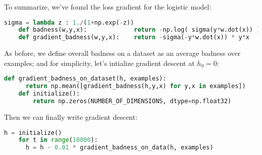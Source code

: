   \vspace{\baselineskip}

  To summarize, we've found the loss gradient for the logistic model:
  \begin{lstlisting}[language=Python, basicstyle=\footnotesize\ttfamily]
    sigma = lambda z : 1./(1+np.exp(-z))
    def badness(w,y,x):             return -np.log( sigma(y*w.dot(x)) )
    def gradient_badness(w,y,x):    return -sigma(-y*w.dot(x)) * y*x
  \end{lstlisting}
  As before, we define overall badness on a dataset as an average badness over
  examples; and for simplicity, let's intialize gradient descent at $h_0=0$:
  \begin{lstlisting}[language=Python, basicstyle=\footnotesize\ttfamily]
    def gradient_badness_on_dataset(h, examples):
      return np.mean([gradient_badness(h,y,x) for y,x in examples])
    def initialize():
        return np.zeros(NUMBER_OF_DIMENSIONS, dtype=np.float32)
  \end{lstlisting}
  Then we can finally write gradient descent:
  \begin{lstlisting}[language=Python, basicstyle=\footnotesize\ttfamily]
    h = initialize()
    for t in range(10000):
      h = h - 0.01 * gradient_badness_on_data(h, examples)
  \end{lstlisting}


  \begin{marginfigure}
     \\
      \vspace{4cm}\\
  \end{marginfigure}



  \newpage
{}\marginnote{\veryoptional}

\marginnote{\veryoptional}
  \par\attnsam{}
  \par\attnsam{}
  \par{}
  \par{}

